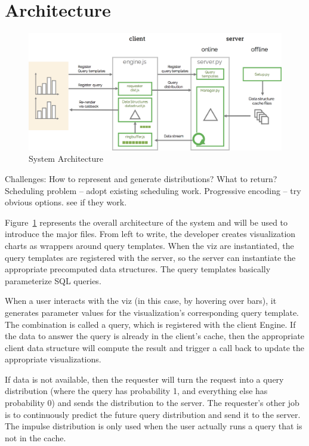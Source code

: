 \section{Architecture}\label{s:arch}


\begin{figure}[ht]
	\centering
	\includegraphics[width=1\columnwidth]{figures/arch}
 	\caption{System Architecture}
  \label{fig:arch}
\end{figure}


Challenges:   How to represent and generate distributions?
What to return?  Scheduling problem -- adopt existing scheduling work.
Progressive encoding -- try obvious options.  see if they work.


Figure~\ref{fig:arch} represents the overall architecture of the system and will be used to introduce the major files.
From left to write, the developer creates visualization charts as wrappers around query templates. When the viz are instantiated, the query templates are registered with the server, so the server can instantiate the appropriate precomputed data structures. The query templates basically parameterize SQL queries.

When a user interacts with the viz (in this case, by hovering over bars), it generates parameter values for the visualization's corresponding query template. The combination is called a query, which is registered with the client Engine. If the data to answer the query is already in the client's cache, then the appropriate client data structure will compute the result and trigger a call back to update the appropriate visualizations.

If data is not available, then the requester will turn the request into a query distribution (where the query has probability 1, and everything else has probability 0) and sends the distribution to the server. The requester's other job is to continuously predict the future query distribution and send it to the server. The impulse distribution is only used when the user actually runs a query that is not in the cache.


